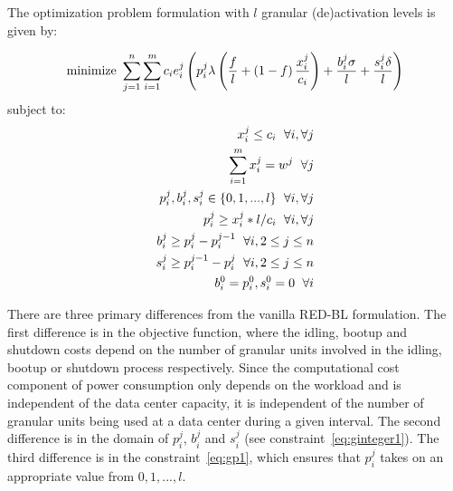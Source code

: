 The optimization problem formulation with $l$ granular (de)activation levels is given by:
 
\begin{align}
\text{minimize } \sum_{j=1}^{n} \sum_{i=1}^{m} c_i e_i^j\left(p_i^j \lambda\left(\frac{f}{l}+\left(1-f\right)\frac{x_i^j}{c_i}\right) + \frac{b_i^j \sigma}{l} + \frac{s_i^j \delta}{l}\right)\notag
\end{align}
subject to:
\begin{align}
x_i^j \le c_i \hspace{6 pt} \forall i, \forall j \label{eq:gcapcon}\\
\sum_{i = 1}^{m} x_i^j = w^j \hspace{6 pt} \forall j \label{eq:gworkcon}\\
p_i^j, b_i^j, s_i^j \in \{0,1,...,l\} \hspace{6 pt} \forall i, \forall j \label{eq:ginteger1}\\
p_i^j \ge x_i^j*l/c_i \hspace{6 pt} \forall i, \forall j \label{eq:gp1}\\
b_i^j \ge p_i^j - p_i^{j-1} \hspace{6 pt} \forall i, 2 \le j \le n \label{eq:gbcon}\\
s_i^j \ge p_i^{j-1} - p_i^j \hspace{6 pt} \forall i, 2 \le j \le n \label{eq:gscon}\\
b_i^0 = p_i^0, s_i^0 = 0 \hspace{6 pt} \forall i \label{eq:gbcon1}
\end{align}

There are three primary differences from the vanilla RED-BL formulation. The first difference is in the objective function, where the idling, bootup and shutdown costs depend on the number of granular units involved in the idling, bootup or shutdown process respectively. Since the computational cost component of power consumption only depends on the workload and is independent of the data center capacity, it is independent of the number of granular units being used at a data center during a given interval. The second difference is in the domain of $p_i^j$, $b_i^j$ and $s_i^j$ (see constraint~\ref{eq:ginteger1}). The third difference is in the constraint~\ref{eq:gp1}, which ensures that $p_i^j$ takes on an appropriate value from $0,1,...,l$.

